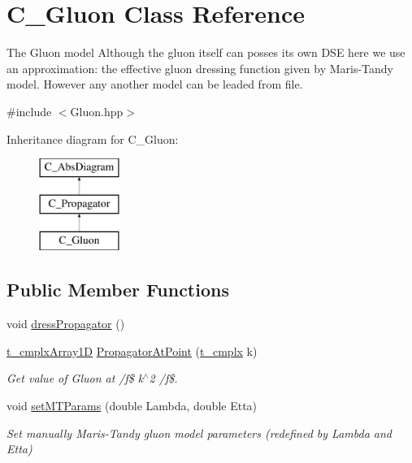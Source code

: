 \hypertarget{class_c___gluon}{\section{C\-\_\-\-Gluon Class Reference}
\label{class_c___gluon}
}


The Gluon model Although the gluon itself can posses its own D\-S\-E here we use an approximation\-: the effective gluon dressing function given by Maris-\/\-Tandy model. However any another model can be leaded from file.  




{\ttfamily \#include $<$Gluon.\-hpp$>$}

Inheritance diagram for C\-\_\-\-Gluon\-:\begin{figure}[H]
\begin{center}
\leavevmode
\includegraphics[height=3.000000cm]{class_c___gluon}
\end{center}
\end{figure}
\subsection*{Public Member Functions}
\begin{DoxyCompactItemize}
\item 
void \hyperlink{class_c___gluon_a44b5ce943df3ea75d258a68b1c82d865}{dress\-Propagator} ()
\item 
\hyperlink{types_8h_aab52f79903881ec15d289b3dbfb102fd}{t\-\_\-cmplx\-Array1\-D} \hyperlink{class_c___gluon_abfa90c782397bcb81c98529d46dc081f}{Propagator\-At\-Point} (\hyperlink{types_8h_aa75ae339052372f671bb263e6a272e82}{t\-\_\-cmplx} k)
\begin{DoxyCompactList}\small\item\em Get value of Gluon at /f\$ k$^\wedge$2 /f\$. \end{DoxyCompactList}\item 
void \hyperlink{class_c___gluon_a2a2f857431b7a3cb1142631d31507091}{set\-M\-T\-Params} (double Lambda, double Etta)
\begin{DoxyCompactList}\small\item\em Set manually Maris-\/\-Tandy gluon model parameters (redefined by Lambda and Etta) \end{DoxyCompactList}\end{DoxyCompactItemize}
